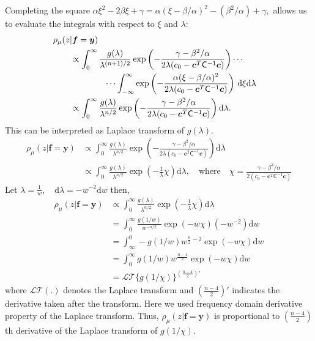 \documentclass{iitthesis}          %
\newcommand{\bm}[1]{\boldsymbol{#1}}
\newcommand{\dif}[1]{\text{d}{#1}}
\newcommand{\D}[1]{\text{d}{#1}}
\newcommand{\vc}{\bm{c}}
\newcommand{\vf}{\bm{f}}
\newcommand{\vy}{\bm{y}}
\newcommand{\mC}{\mathsf{C}}
\begin{document}
Completing the square $
\alpha \xi^2 -2 \beta \xi + \gamma 
= \alpha (\xi -\beta/\alpha)^2  - (\beta^2/\alpha) + \gamma,
$
allows us to evaluate the integrals with respect to $\xi$ and $\lambda$:
\begin{align*}
\MoveEqLeft{\rho_{\mu}(z | \vf = \vy)} &
\\
& \propto \displaystyle \int_{0}^\infty  \frac{g(\lambda)}{\lambda^{(n+1)/2}}  \exp\left( -\frac{  \gamma - \beta^2/\alpha}{2\lambda(c_0  -\vc ^T \mC^{-1} \vc)} \right)  \cdots 
\\
& \qquad \qquad \cdots \int_{-\infty}^\infty  \exp\left( -\frac{\alpha (\xi -\beta/\alpha)^2}{2\lambda(c_0  -\vc ^T \mC^{-1} \vc)} \right) \, \D \xi \D \lambda 
\\
& \propto \displaystyle \int_{0}^\infty  \frac{g(\lambda)}{\lambda^{n/2}}  \exp\left( -\frac{  \gamma - \beta^2/\alpha}{2\lambda(c_0  -\vc ^T \mC^{-1} \vc)} \right) \D \lambda 
.
\end{align*}
This can be interpreted as Laplace transform of $g(\lambda)$.
\begin{align*}
{\rho_{\mu}(z | \vf = \vy)} 
& \propto \displaystyle \int_{0}^\infty  \frac{g(\lambda)}{\lambda^{n/2}}  \exp\left( -\frac{  \gamma - \beta^2/\alpha}{2\lambda(c_0  -\vc ^T \mC^{-1} \vc)} \right) \D \lambda 
\\
& \propto \int_{0}^\infty \frac{g(\lambda)}{\lambda^{n/2}}
\exp \left(  - \frac{1}{\lambda} \chi \right)
\dif{\lambda}, \quad \text{where} \quad \chi = \frac{  \gamma - \beta^2/\alpha}{2(c_0  -\vc ^T \mC^{-1} \vc)}
\end{align*}
Let $\displaystyle \lambda = \frac{1}{w}, \quad \dif{\lambda} = -w^{-2} \dif{w}$ then,
\begin{align*}
{\rho_{\mu}(z | \vf = \vy)} 
& \propto \int_{0}^\infty \frac{g(\lambda)}{\lambda^{n/2}}
\exp \left(  - \frac{1}{\lambda} \chi \right)
\dif{\lambda} 
\\
&= \int_{0}^\infty \frac{g(1/w)  }{w^{-n/2}}
\exp \left(  - w \chi \right)
(-w^{-2})\dif{w}
\\
&= \int_\infty^0 -g(1/w) w^{\frac n2 - 2}
\exp \left(  - w \chi \right)
\D{w}
\\
&= \int_0^\infty g(1/w) w^{\frac{n-4}2}
\exp \left(  - w \chi \right)
\D{w}
\\
& = \mathcal{LT} \{ g(1/\chi) \}^{(\frac{n-4}2)'}
\end{align*}
where $\mathcal{LT}(.)$ denotes the Laplace transform and $(\frac{n-4}2)'$ indicates the derivative taken after the transform.
Here we used frequency domain derivative property of the Laplace transform. 
Thus, $\rho_{\mu}(z | \vf = \vy)$  is proportional to $(\frac{n-4}{2})$th derivative of the Laplace transform of $g(1/\chi)$.
\end{document}
